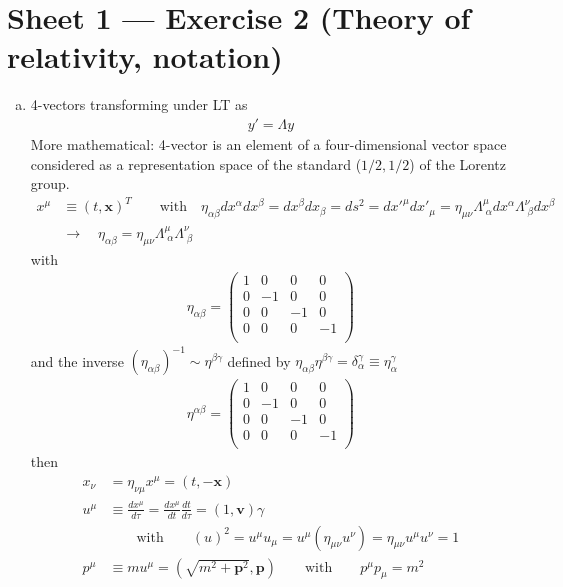 \documentclass[10pt,a4paper]{report}
\theoremstyle{definition}
\begin{document}
\section{Sheet 1 — Exercise 2 (Theory of relativity, notation)}
\begin{enumerate}[a)]
\item 4-vectors transforming under LT as
\begin{align}
y'=\Lambda y
\end{align}
More mathematical: 4-vector is an element of a four-dimensional vector space considered as a representation space of the standard ($1/2,1/2$) of the Lorentz group. 
\begin{align}
x^\mu&\equiv(t,\mathbf{x})^T\qquad\text{with}\quad \eta_{\alpha\beta}dx^\alpha dx^\beta=dx^\beta dx_\beta=ds^2=dx'^\mu dx'_\mu=\eta_{\mu\nu}\Lambda^\mu_{\;\alpha}dx^\alpha \Lambda^\nu_{\;\beta}dx^\beta\\
&\rightarrow\quad\eta_{\alpha\beta}=\eta_{\mu\nu}\Lambda^\mu_{\;\alpha} \Lambda^\nu_{\;\beta}
\end{align}
with
\begin{align}
\eta_{\alpha\beta}=\left(\begin{array}{cccc}
1&0&0&0\\
0&-1&0&0\\
0&0&-1&0\\
0&0&0&-1\\
\end{array}\right)
\end{align}
and the inverse $(\eta_{\alpha\beta})^{-1}\sim\eta^{\beta\gamma}$ defined by $\eta_{\alpha\beta} \eta^{\beta\gamma}=\delta^\gamma_\alpha\equiv\eta^\gamma_\alpha$
\begin{align}
\eta^{\alpha\beta}=\left(\begin{array}{cccc}
1&0&0&0\\
0&-1&0&0\\
0&0&-1&0\\
0&0&0&-1\\
\end{array}\right)
\end{align}
then
\begin{align}
x_\nu&=\eta_{\nu\mu}x^\mu=(t,-\mathbf{x})\\
u^\mu&\equiv\frac{dx^\mu}{d\tau}=\frac{dx^\mu}{dt}\frac{dt}{d\tau}=(1,\mathbf{v})\gamma\\
&\qquad\text{with}\qquad (u)^2=u^\mu u_\mu=u^\mu(\eta_{\mu\nu} u^\nu)=\eta_{\mu\nu}u^\mu u^\nu=1\\
p^\mu&\equiv mu^\mu=(\sqrt{m^2+\mathbf{p}^2},\mathbf{p})\qquad\text{with}\qquad p^\mu p_\mu=m^2\\

\end{align}
\end{enumerate}
\end{document}
